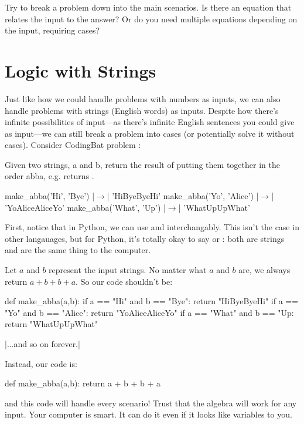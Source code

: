 \documentclass[12pt]{scrartcl}
\begin{document}
Try to break a problem down into the main scenarios. Is there an equation that relates the input to the answer? Or do you need multiple equations depending on the input, requiring cases?

\section{Logic with Strings}
Just like how we could handle problems with numbers as inputs, we can also handle problems with strings (English words) as inputs. Despite how there's infinite possibilities of input---as there's infinite English sentences you could give as input---we can still break a problem into cases (or potentially solve it without cases). Consider CodingBat problem :

\begin{callout}
    Given two strings, a and b, return the result of putting them together in the order abba, e.g.  returns .

    \begin{purecode}
        make_abba('Hi', 'Bye')   |$\to$| 'HiByeByeHi'
        make_abba('Yo', 'Alice') |$\to$| 'YoAliceAliceYo'
        make_abba('What', 'Up')  |$\to$| 'WhatUpUpWhat'
    \end{purecode}
\end{callout}

First, notice that in Python, we can use  and  interchangably. This isn't the case in other langauages, but for Python, it's totally okay to say  or : both are strings and are the same thing to the computer.

Let $a$ and $b$ represent the input strings. No matter what $a$ and $b$ are, we always return $a + b + b + a$. So our code shouldn't be:
\begin{python}
    def make_abba(a,b):
        if a == "Hi" and b == "Bye":
            return "HiByeByeHi"
        if a == "Yo" and b == "Alice":
            return "YoAliceAliceYo"
        if a == "What" and b == "Up:
            return "WhatUpUpWhat"
        
        |...and so on forever.|
\end{python}
Instead, our code is:
\begin{python}
    def make_abba(a,b):
        return a + b + b + a
\end{python}
and this code will handle every scenario! Trust that the algebra will work for any input. Your computer is smart. It can do it even if it looks like variables to you.
\end{document}
